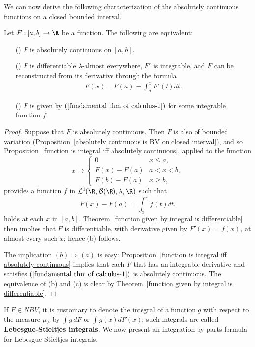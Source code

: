 We can now derive the following characterization of the absolutely continuous functions on a closed bounded interval.
\begin{theorem}
Let $F:[a,b]\to\R$ be a function. The following are equivalent:
\begin{itemize}
\item[(\rmnum{1})] $F$ is absolutely continuous on $[a,b]$.
\item[(\rmnum{2})] $F$ is differentiable $\lambda$-almost everywhere, $F'$ is integrable, and $F$ can be reconstructed from its derivative through the formula
\begin{align}\label{fundamental thm of calculus-1}
F(x)-F(a)=\int_a^xF'(t)dt.
\end{align}
\item[(\rmnum{3})] $F$ is given by $(\ref{fundamental thm of calculus-1})$ for some integrable function $f$.
\end{itemize}
\end{theorem}
\begin{proof}
Suppose that $F$ is absolutely continuous. Then $F$ is also of bounded variation (Proposition~\ref{absolutely continuous is BV on closed interval}), and so Proposition~\ref{function is integral iff absolutely continuous}, applied to the function
\[x\mapsto\begin{cases}
0&x\leq a,\\
F(x)-F(a)&a<x<b,\\
F(b)-F(a)&x\geq b,
\end{cases}\]
provides a function $f$ in $\mathcal{L}^1(\R,\mathcal{B}(\R),\lambda,\R)$ such that
\[F(x)-F(a)=\int_{a}^{x}f(t)dt.\]
holds at each $x$ in $[a,b]$. Theorem~\ref{function given by integral is differentiable} then implies that $F$ is differentiable, with derivative given by $F'(x)=f(x)$, at almost every such $x$; hence (b) follows.\par
The implication $(b)\Rightarrow(a)$ is easy: Proposition~\ref{function is integral iff absolutely continuous} implies that each $F$ that has an integrable derivative and satisfies $(\ref{fundamental thm of calculus-1})$ is absolutely continuous. The equivalence of (b) and (c) is clear by Theorem~\ref{function given by integral is differentiable}.
\end{proof}
If $F\in NBV$, it is customary to denote the integral of a function $g$ with respect to the measure $\mu_F$ by $\int g\,dF$ or $\int g(x)dF(x)$; such integrals are called \textbf{Lebesgue-Stieltjes integrals}. We now present an integration-by-parts formula for Lebesgue-Stieltjes integrals.
